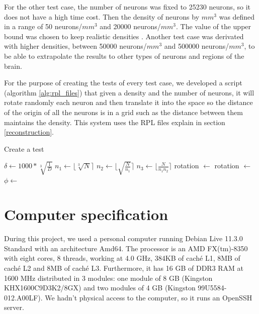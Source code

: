 For the other test case, the number of neurons was fixed to 25230 neurons, so it does not have a high time cost. Then the density of neurons by $mm^3$ was defined in a range of 50 neurons/$mm^3$ and 20000 neurons/$mm^3$. The value of the upper bound was chosen to keep realistic densities \cite{Keller2018-dm}. Another test case was derivated with higher densities, between 50000 neurons/$mm^3$ and 500000 neurons/$mm^3$, to be able to extrapolate the results to other types of neurons and regions of the brain.

For the purpose of creating the tests of every test case, we developed a script (algorithm \ref{alg:rpl_files}) that given a density and the number of neurons, it will rotate randomly each neuron and then translate it into the space so the distance of the origin of all the neurons is in a grid such as the distance between them maintains the density. This system uses the RPL files explain in section \ref{reconstruction}.

\begin{algorithm}[h!]
    \caption{Create a test
        \label{alg:rpl_files}}
    \begin{algorithmic}[1]
        \State $\delta \gets 1000*\sqrt[3]{\frac{1}{D}}$
        \State $n_1 \gets \lfloor \sqrt[3]{N} \rceil$
        \State $n_2 \gets \lfloor \sqrt{\frac{N}{n_1}} \rceil$
        \State $n_3 \gets \lfloor \frac{N}{n_1n_2} \rceil$
                    \State rotation $\gets$ 
                    \State rotation $\gets$ 
                        \State $\phi \gets$ 
                        \State {}
                    \EndFor
                    \State {}
                \EndFor
            \EndFor
        \EndFor
    \EndProcedure
    \end{algorithmic}
\end{algorithm}


\section{Computer specification}
During this project, we used a personal computer running Debian Live 11.3.0 Standard with an architecture Amd64. The processor is an AMD FX(tm)-8350 with eight cores, 8 threads, working at 4.0 GHz, 384KB of caché L1, 8MB of caché L2 and 8MB of caché L3. Furthermore, it has 16 GB of DDR3 RAM at 1600 MHz distributed in 3 modules: one module of 8 GB (Kingston KHX1600C9D3K2/8GX) and two modules of 4 GB (Kingston 99U5584-012.A00LF). We hadn't physical access to the computer, so it runs an OpenSSH server.